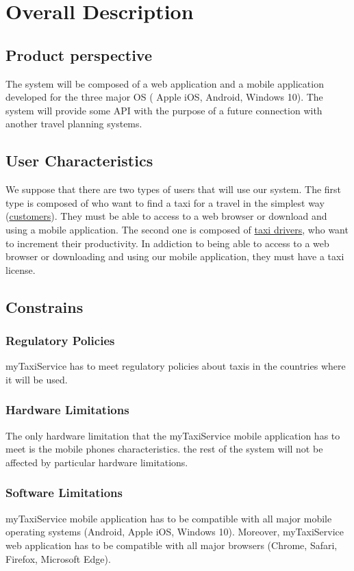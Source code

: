 \chapter{Overall Description}
	
	\section{Product perspective}
	The system will be composed of a web application and a mobile application developed for the three major OS ( Apple iOS, Android, Windows 10). The system will provide some API with the purpose of a future connection with another travel planning systems. 
		
	\section{User Characteristics}
	We suppose that there are two types of users that will use our system. The first type is composed of who want to find a taxi for a travel in the simplest way (\hyperref[sec:customer]{customers}). They must be able to access to a web browser or download and using a mobile application. The second one is composed of \hyperref[sec:tdriver]{taxi drivers}, who want to increment their productivity. In addiction to being able to access to a web browser or downloading and using our mobile application, they must have a taxi license.
		
	\section{Constrains}
		
		\subsection{Regulatory Policies}
		myTaxiService  has to meet regulatory policies about taxis in the countries where it will be used.

		\subsection{Hardware Limitations}
		The only hardware limitation that the myTaxiService mobile application has to meet is the mobile phones characteristics. the rest of the 			system will not be affected by particular hardware limitations.

		\subsection{Software Limitations}
		myTaxiService mobile application has to be compatible with all major mobile operating systems (Android, Apple iOS, Windows 10).
		Moreover, myTaxiService web application has to be compatible with all major browsers (Chrome, Safari, Firefox, Microsoft Edge).

